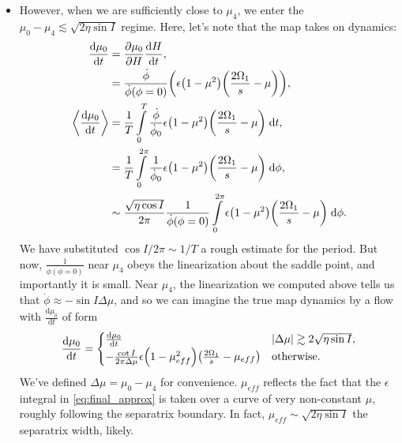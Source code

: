 \documentclass[11pt,
        usenames, %
        dvipsnames %
    ]{article}
\newcommand*{\rd}[2]{\frac{\mathrm{d}#1}{\mathrm{d}#2}}
\newcommand*{\pd}[2]{\frac{\partial#1}{\partial#2}}
\DeclarePairedDelimiter\abs{\lvert}{\rvert}
\DeclarePairedDelimiter\ev{\langle}{\rangle}
\DeclarePairedDelimiter\p{\lparen}{\rparen}
\begin{document}
\begin{itemize}
    \item However, when we are sufficiently close to $\mu_4$, we enter the
        $\mu_0 - \mu_4 \lesssim \sqrt{2\eta \sin I}$ regime. Here, let's note
        that the map takes on dynamics:
        \begin{align}
            \rd{\mu_0}{t} &= \pd{\mu_0}{H}\rd{H}{t},\nonumber\\
                &= \frac{\dot{\phi}}{\dot{\phi}(\phi = 0)}
                    \p*{\epsilon\p*{1 - \mu^2}\p*{\frac{2\Omega_1}{s}
                        - \mu}},\nonumber\\
            \ev*{\rd{\mu_0}{t}} &=
                \frac{1}{T}\int\limits_0^T
                    \frac{\dot{\phi}}{\dot{\phi}_0}
                        \epsilon\p*{1 - \mu^2}\p*{\frac{2\Omega_1}{s} - \mu}
                            \;\mathrm{d}t,\nonumber\\
                &= \frac{1}{T}\int\limits_0^{2\pi}
                    \frac{1}{\dot{\phi}_0}
                        \epsilon\p*{1 - \mu^2}\p*{\frac{2\Omega_1}{s} - \mu}
                            \;\mathrm{d}\phi,\nonumber\\
                &\sim \frac{\sqrt{\eta \cos I}}{2\pi}
                    \frac{1}{\dot{\phi}(\phi = 0)}
                    \int\limits_0^{2\pi}
                        \epsilon\p*{1 - \mu^2}\p*{\frac{2\Omega_1}{s} - \mu}
                        \;\mathrm{d}\phi.\label{eq:final_approx}
        \end{align}
        We have substituted $\cos I/2\pi \sim 1/T$ a rough estimate
        for the period. But now, $\frac{1}{\dot{\phi}(\phi = 0)}$ near $\mu_4$
        obeys the linearization about the saddle point, and importantly it is
        small. Near $\mu_4$, the linearization we computed above tells us that
        $\dot{\phi} \approx - \sin I \Delta \mu$, and so we can imagine the
        true map dynamics by a flow with $\rd{\mu_0}{t}$ of form
        \begin{equation}
            \rd{\mu_0}{t} =
                \begin{cases}
                    \rd{\mu_0}{t} & \abs*{\Delta \mu} \gtrsim
                        2\sqrt{\eta \sin I},\\
                    -\frac{\cot I}{2\pi \Delta \mu}
                        \epsilon\p*{1 - \mu_{eff}^2}
                            \p*{\frac{2\Omega_1}{s} - \mu_{eff}}
                            & \text{otherwise}.
                \end{cases}
        \end{equation}
        We've defined $\Delta \mu = \mu_0 - \mu_4$ for convenience. $\mu_{eff}$
        reflects the fact that the $\epsilon$ integral in
        \autoref{eq:final_approx} is taken over a curve of very non-constant
        $\mu$, roughly following the separatrix boundary. In fact, $\mu_{eff}
        \sim \sqrt{2\eta \sin I}$ the separatrix width, likely.


\end{itemize}
\end{document}
